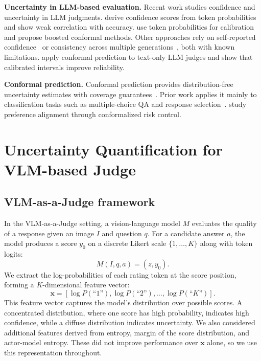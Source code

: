 \documentclass{article}
\begin{document}
\textbf{Uncertainty in LLM-based evaluation.}
Recent work studies confidence and uncertainty in LLM judgments. \citet{wagner2024llmconfidence} derive confidence scores from token probabilities and show weak correlation with accuracy. \citet{xie2025boosted} use token probabilities for calibration and propose boosted conformal methods. Other approaches rely on self-reported confidence~\citep{xiong2024selfconsistency} or consistency across multiple generations~\citep{tian2023consistency}, both with known limitations. \citet{sheng2025analyzing} apply conformal prediction to text-only LLM judges and show that calibrated intervals improve reliability. 

\textbf{Conformal prediction.}
Conformal prediction provides distribution-free uncertainty estimates with coverage guarantees~\citep{vovk2005algorithmic}. Prior work applies it mainly to classification tasks such as multiple-choice QA and response selection~\citep{kumar2023conformal,zhang2024conformal,su2024api,vishwakarma2025conformal,quach2024conformal,mohri2024language,wang2024cpsele,kladny2025conformal}. \citet{jung2024conformal} study preference alignment through conformalized risk control. 

\section{Uncertainty Quantification for VLM-based Judge}
\label{sec:uncertainty}

\subsection{VLM-as-a-Judge framework}

In the VLM-as-a-Judge setting, a vision-language model $M$ evaluates the quality of a response given an image $I$ and question $q$. For a candidate answer $a$, the model produces a score $y_0$ on a discrete Likert scale $\{1, \ldots, K\}$ along with token logits:
\begin{equation}
M(I, q, a) = (z, y_0).
\end{equation}
We extract the log-probabilities of each rating token at the score position, forming a $K$-dimensional feature vector:
\begin{equation}
\mathbf{x} = [\log P(\text{``1''}), \log P(\text{``2''}), \ldots, \log P(\text{``$K$''})].
\label{eq:features}
\end{equation}
This feature vector captures the model's distribution over possible scores. A concentrated distribution, where one score has high probability, indicates high confidence, while a diffuse distribution indicates uncertainty. We also considered additional features derived from entropy, margin of the score distribution, and actor-model entropy. These did not improve performance over $\mathbf{x}$ alone, so we use this representation throughout. 
\end{document}
